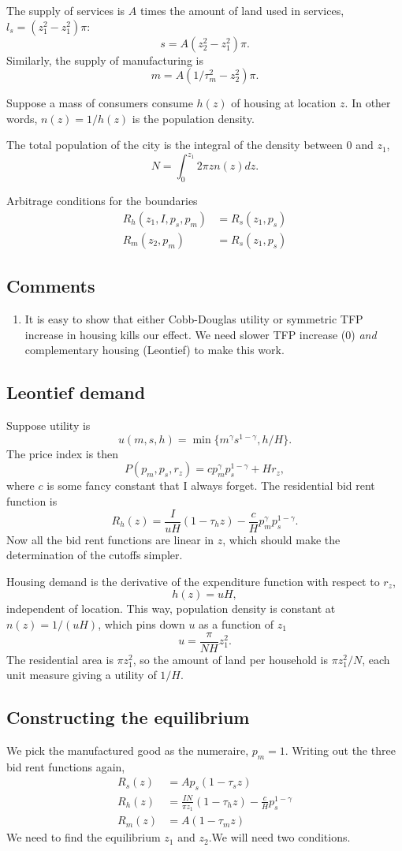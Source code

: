 \documentclass[letter]{amsart}
\theoremstyle{definition}
\theoremstyle{remark}
\numberwithin{equation}{section}
\begin{document}

The supply of services is $A$ times the amount of land used in services, $l_s = (z_1^2-z_1^2)\pi$:
\[
s = A(z_2^2-z_1^2)\pi.
\]
Similarly, the supply of manufacturing is
\[
m = A(1/\tau_m^2-z_2^2)\pi.
\]

Suppose a mass of consumers consume $h(z)$ of housing at location $z$. In other words, $n(z) = 1/h(z)$ is the population density.

The total population of the city is the integral of the density between $0$ and $z_1$,
\[
N = \int_{0}^{z_1}2\pi z n(z) dz.
\]

Arbitrage conditions for the boundaries
\begin{align}
R_h(z_1,I,p_s,p_m) &= R_s(z_1,p_s)\\
R_m(z_2,p_m) &= R_s(z_1,p_s)
\end{align}
\subsection{Comments}
\begin{enumerate}
  \item It is easy to show that either Cobb-Douglas utility or symmetric TFP increase in housing kills our effect. We need slower TFP increase (0) \emph{and} complementary housing (Leontief) to make this work.
\end{enumerate}
\subsection{Leontief demand}
Suppose utility is
\[
u(m,s,h) = \min\{m^\gamma s^{1-\gamma}, h/H\}.
\]
The price index is then
\[
P(p_m,p_s,r_z) = c p_m^\gamma p_s^{1-\gamma} + H r_z,
\]
where $c$ is some fancy constant that I always forget. The residential bid rent function is
\[
R_h(z) = \frac{I}{uH}(1-\tau_h z) -\frac cH p_m^\gamma p_s^{1-\gamma}.
\]
Now all the bid rent functions are linear in $z$, which should make the determination of the cutoffs simpler.

Housing demand is the derivative of the expenditure function with respect to $r_z$,
\[
h(z) = u H,
\]
independent of location. This way, population density is constant at $n(z) = 1/(uH)$, which pins down $u$ as a function of $z_1$
\[
u = \frac{\pi}{N H}z_1^2.
\]
The residential area is $\pi z_1^2$, so the amount of land per household is $\pi z_1^2/N$, each unit measure giving a utility of $1/H$.

\subsection{Constructing the equilibrium}
We pick the manufactured good as the  numeraire, $p_m=1$. Writing out the three bid rent functions again,
\begin{align*}
R_s(z) &= Ap_s(1-\tau_s z)\\
R_h(z) &= \frac{IN}{\pi z_1}(1-\tau_h z) -\frac {c}{H} p_s^{1-\gamma}\\
R_m(z) &= A(1-\tau_m z)
\end{align*}
We need to find the equilibrium $z_1$ and $z_2$.We will need two conditions.
\end{document}
